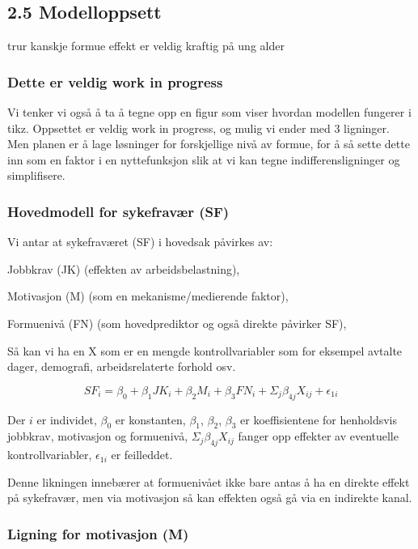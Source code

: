\documentclass[
  12pt,
  a4paper,
  DIV=11,
  numbers=noendperiod]{scrartcl}
\begin{document}
\subsection{2.5 Modelloppsett}\label{modelloppsett}

trur kanskje formue effekt er veldig kraftig på ung alder

\subsubsection{Dette er veldig work in
progress}\label{dette-er-veldig-work-in-progress}

Vi tenker vi også å ta å tegne opp en figur som viser hvordan modellen
fungerer i tikz. Oppsettet er veldig work in progress, og mulig vi ender
med 3 ligninger. Men planen er å lage løsninger for forskjellige nivå av
formue, for å så sette dette inn som en faktor i en nyttefunksjon slik
at vi kan tegne indifferensligninger og simplifisere.

\subsubsection{Hovedmodell for sykefravær
(SF)}\label{hovedmodell-for-sykefravuxe6r-sf}

Vi antar at sykefraværet (SF) i hovedsak påvirkes av:

Jobbkrav (JK) (effekten av arbeidsbelastning),

Motivasjon (M) (som en mekanisme/medierende faktor),

Formuenivå (FN) (som hovedprediktor og også direkte påvirker SF),

Så kan vi ha en X som er en mengde kontrollvariabler som for eksempel
avtalte dager, demografi, arbeidsrelaterte forhold osv.

\[
SF_i = \beta_0 + \beta_1 JK_i + \beta_2 M_i + \beta_3 FN_i + \Sigma_j \beta_{4j}X_{ij} + \epsilon_{1i}
\]

Der \(i\) er individet, \(\beta_0\) er konstanten, \(\beta_1\),
\(\beta_2\), \(\beta_3\) er koeffisientene for henholdsvis jobbkrav,
motivasjon og formuenivå, \(\Sigma_j \beta_{4j}X_{ij}\) fanger opp
effekter av eventuelle kontrollvariabler, \(\epsilon_{1i}\) er
feilleddet.

Denne likningen innebærer at formuenivået ikke bare antas å ha en
direkte effekt på sykefravær, men via motivasjon så kan effekten også gå
via en indirekte kanal.

\subsubsection{Ligning for motivasjon
(M)}\label{ligning-for-motivasjon-m}
\end{document}
